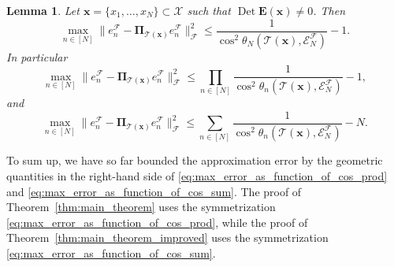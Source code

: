 \documentclass[twoside,11pt]{book}
\newtheorem{lemma}{Lemma}
\numberwithin{theorem}{chapter}
\numberwithin{definition}{chapter}
\numberwithin{proposition}{chapter}
\numberwithin{corollary}{chapter}
\numberwithin{example}{chapter}
\numberwithin{lemma}{chapter}
\DeclareMathOperator{\Det}{Det}
\DeclareMathOperator{\F}{\mathcal{F}}
\newcommand{\ab}[1]{\textcolor{red}{#1}}
\begin{document}

\begin{lemma}\label{lemma:max_error_cos}
Let $\bm{x} = \{x_{1}, \dots , x_{N}\} \subset \mathcal{X}$ such that $\Det \bm{E}(\bm{x}) \neq 0$. Then
\begin{equation}\label{eq:max_error_as_function_of_cos}
	\max_{ n \in [N]} \|e_{n}^{\F} - \bm{\Pi}_{\mathcal{T}(\bm{x})} e_{n}^{\F}\|_{\mathcal{F}}^{2} \leq \frac{1}{\cos^{2} \theta_{N}(\mathcal{T}(\bm{x}),\mathcal{E}^{\mathcal{F}}_{N})} - 1. 
\end{equation}
In particular
\begin{equation}\label{eq:max_error_as_function_of_cos_prod}
\max_{ n \in [N]} \|e_{n}^{\F} - \bm{\Pi}_{\mathcal{T}(\bm{x})} e_{n}^{\F}\|_{\mathcal{F}}^{2} \leq \prod\limits_{n \in [N]}\frac{1}{\cos^{2} \theta_{n}(\mathcal{T}(\bm{x}),\mathcal{E}^{\mathcal{F}}_{N})} - 1,
\end{equation}
and
\begin{equation}\label{eq:max_error_as_function_of_cos_sum}
\max_{ n \in [N]} \|e_{n}^{\F} - \bm{\Pi}_{\mathcal{T}(\bm{x})} e_{n}^{\F}\|_{\mathcal{F}}^{2} \leq \sum\limits_{n \in [N]}\frac{1}{\cos^{2} \theta_{n}(\mathcal{T}(\bm{x}),\mathcal{E}^{\mathcal{F}}_{N})} - N.
\end{equation}
\end{lemma}





To sum up, we have so far bounded the approximation error by the geometric quantities in the right-hand side of \eqref{eq:max_error_as_function_of_cos_prod} and \eqref{eq:max_error_as_function_of_cos_sum}.
The proof of Theorem~\ref{thm:main_theorem} uses the symmetrization \eqref{eq:max_error_as_function_of_cos_prod}, while
the proof of Theorem~\ref{thm:main_theorem_improved} uses the symmetrization \eqref{eq:max_error_as_function_of_cos_sum}.
\end{document}
